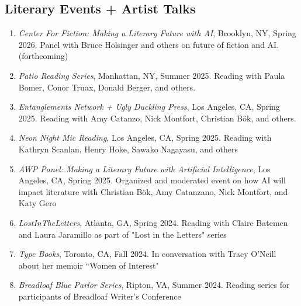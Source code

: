     \subsection{Literary Events + Artist Talks}
    \begin{enumerate}
    
     \item \emph{Center For Fiction: Making a Literary Future with AI}, Brooklyn, NY, Spring 2026. \subitem Panel with Bruce Holsinger and others on future of fiction and AI. (forthcoming)\\
    
      \item \emph{Patio Reading Series}, Manhattan, NY, Summer 2025. \subitem Reading with Paula Bomer, Conor Truax, Donald Berger, and others.\\
    
     \item \emph{Entanglements Network + Ugly Duckling Press}, Los Angeles, CA, Spring 2025. \subitem Reading with Amy Catanzo, Nick Montfort, Christian B\"ok, and others.\\
    
    \item \emph{Neon Night Mic Reading}, Los Angeles, CA, Spring 2025. \subitem Reading with Kathryn Scanlan, Henry Hoke, Sawako Nagayasu, and others\\
    
    	\item \emph{AWP Panel: Making a Literary Future with Artificial Intelligence}, Los Angeles, CA, Spring 2025. \subitem Organized and moderated event on how AI will impact literature with Christian B\"ok, Amy Catanzano, Nick Montfort, and Katy Gero  \\
    
    	\item \emph{LostInTheLetters}, Atlanta, GA, Spring 2024. \subitem Reading with Claire Batemen and Laura Jaramillo as part of "Lost in the Letters" series  \\
    
    	\item \emph{Type Books}, Toronto, CA, Fall 2024. \subitem In conversation with Tracy O'Neill about her memoir ``Women of Interest" \\
    
    	\item \emph{Breadloaf Blue Parlor Series}, Ripton, VA, Summer 2024. \subitem Reading series for participants of Breadloaf Writer's Conference \\
	

\end{enumerate}
